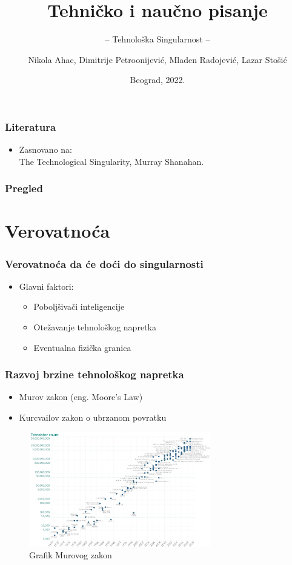 \documentclass{beamer}
\title{Tehničko i naučno pisanje}
\subtitle{-- Tehnološka Singularnost --}
\author{Nikola Ahac, Dimitrije Petroonijević, Mladen Radojević, Lazar Stošić}
\institute{Matematički fakultet\\Univerzitet u Beogradu}
\date{
	\footnotesize{Beograd, 2022.}	
}
\begin{document}
\begin{frame}
	\thispagestyle{empty}
	\titlepage
\end{frame}

\addtocounter{framenumber}{-1}

\begin{frame}[fragile]\frametitle{Literatura}
	\begin{itemize}
		\item Zasnovano na:\\
		The Technological Singularity, Murray Shanahan.
	\end{itemize}
\end{frame}

\begin{frame}
	\frametitle{Pregled} %
	\tableofcontents[hidesubsections] 
\end{frame}

\section{Verovatnoća}

\begin{frame}[fragile]\frametitle{Verovatnoća da će doći do singularnosti}
    \begin{itemize}	
        \item Glavni faktori:
        \begin{itemize}	
            \item Poboljšivači inteligencije
            \item Otežavanje tehnološkog napretka
            \item Eventualna fizička granica
      \end{itemize}
    \end{itemize}
\end{frame}

\begin{frame}[fragile]\frametitle{Razvoj brzine tehnološkog napretka}
    \begin{itemize}	
        \item Murov zakon (eng. Moore's Law)
        \item Kurcvailov zakon o ubrzanom povratku
    \end{itemize}
    \begin{figure}[h!]
        \centering\includegraphics[height=5cm]{moore.png} 
        \caption{Grafik Murovog zakon}
        \label{fig:murovzakon}
    \end{figure}
\end{frame}
\end{document}
